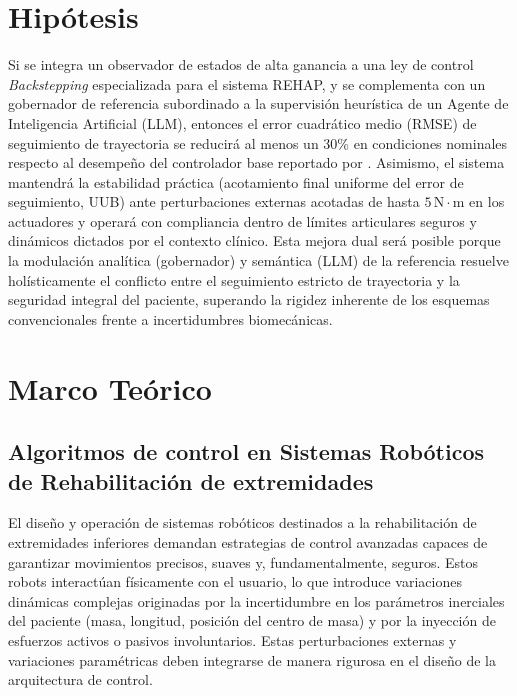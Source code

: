 \documentclass[a4paper,12pt]{article}
\begin{document}
\section{Hipótesis}
Si se integra un observador de estados de alta ganancia a una ley de control \textit{Backstepping} especializada para el sistema REHAP, y se complementa con un gobernador de referencia subordinado a la supervisión heurística de un Agente de Inteligencia Artificial (LLM), entonces el error cuadrático medio (RMSE) de seguimiento de trayectoria se reducirá al menos un 30\% en condiciones nominales respecto al desempeño del controlador base reportado por \citet{reyes2025comparative}. Asimismo, el sistema mantendrá la estabilidad práctica (acotamiento final uniforme del error de seguimiento, UUB) ante perturbaciones externas acotadas de hasta $5\,\mathrm{N{\cdot}m}$ en los actuadores y operará con compliancia dentro de límites articulares seguros y dinámicos dictados por el contexto clínico. Esta mejora dual será posible porque la modulación analítica (gobernador) y semántica (LLM) de la referencia resuelve holísticamente el conflicto entre el seguimiento estricto de trayectoria y la seguridad integral del paciente, superando la rigidez inherente de los esquemas convencionales frente a incertidumbres biomecánicas.

\newpage


\section{Marco Teórico}
\subsection{Algoritmos de control en Sistemas Robóticos de Rehabilitación de extremidades}

El diseño y operación de sistemas robóticos destinados a la rehabilitación de extremidades inferiores demandan estrategias de control avanzadas capaces de garantizar movimientos precisos, suaves y, fundamentalmente, seguros. Estos robots interactúan físicamente con el usuario, lo que introduce variaciones dinámicas complejas originadas por la incertidumbre en los parámetros inerciales del paciente (masa, longitud, posición del centro de masa) y por la inyección de esfuerzos activos o pasivos involuntarios. Estas perturbaciones externas y variaciones paramétricas deben integrarse de manera rigurosa en el diseño de la arquitectura de control.
\end{document}
